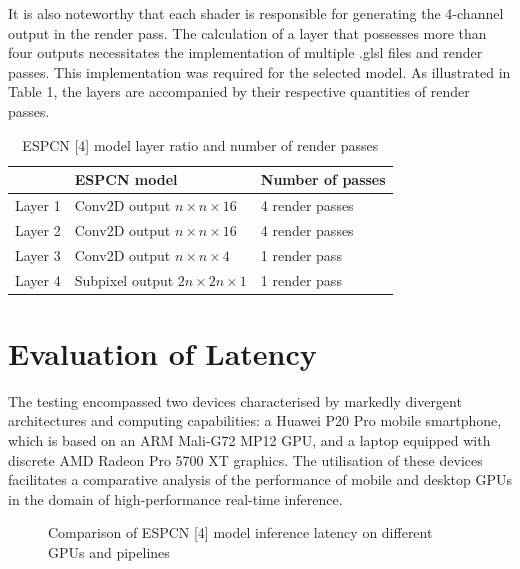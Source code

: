 \documentclass[conference]{IEEEtran}
\begin{document}
It is also noteworthy that each shader is responsible for generating the 4-channel output in the render pass. The calculation of a layer that possesses more than four outputs necessitates the implementation of multiple .glsl files and render passes. This implementation was required for the selected model. As illustrated in Table 1, the layers are accompanied by their respective quantities of render passes.
\begin{table}
    \caption{\label{tab:canonsummary}ESPCN [4] model layer ratio and number of render passes}
    \begin{center}
        \begin{tabular}{|l|l|l|}
            \hline
            & ESPCN model & Number of passes \\
            \hline
            Layer 1 & Conv2D output $n \times n \times 16$ & 4 render passes \\
            \hline
            Layer 2 & Conv2D output $n \times n \times 16$ & 4 render passes \\
            \hline
            Layer 3 & Conv2D output $n \times n \times 4$ & 1 render pass \\
            \hline
            Layer 4 & Subpixel output $2n \times 2n \times 1$ & 1 render pass \\
            \hline
        \end{tabular}
    \end{center}
\end{table}

\section{Evaluation of Latency}
The testing encompassed two devices characterised by markedly divergent architectures and computing capabilities: a Huawei P20 Pro mobile smartphone, which is based on an ARM Mali-G72 MP12 GPU, and a laptop equipped with discrete AMD Radeon Pro 5700 XT graphics. The utilisation of these devices facilitates a comparative analysis of the performance of mobile and desktop GPUs in the domain of high-performance real-time inference.

\begin{figure}[h]
    \caption{Comparison of ESPCN [4] model inference latency on different GPUs and pipelines}
    \label{ris:ORTModelData}
\end{figure}
            
\end{document}
